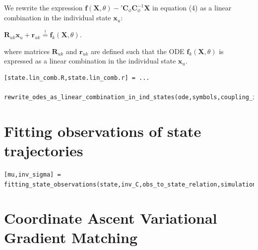 \begin{par}
We rewrite the expression $\mathbf{f}(\mathbf{X},\theta) - {'\mathbf{C}}_{\phi} \mathbf{C}_{\phi}^{-1} \mathbf{X}$ in equation (4) as a linear combination in the individual state $\mathbf{x}_u$:
\end{par} \vspace{1em}
\begin{par}
$\mathbf{R}_{uk} \mathbf{x}_u + \mathbf{r}_{uk} \stackrel{!}{=} \mathbf{f}_k(\mathbf{X},\theta)$.
\end{par} \vspace{1em}
\begin{par}
where matrices $\mathbf{R}_{uk}$ and $\mathbf{r}_{uk}$ are defined such that the ODE $\mathbf{f}_k(\mathbf{X},\theta)$ is expressed as a linear combination in the individual state $\mathbf{x}_u$.
\end{par} \vspace{1em}
\color{RoyalPurple}\begin{verbatim}
[state.lin_comb.R,state.lin_comb.r] = ...
    rewrite_odes_as_linear_combination_in_ind_states(ode,symbols,coupling_idx.states);
\end{verbatim}
\color{black}


\section{Fitting observations of state trajectories}
\color{RoyalPurple}\begin{verbatim}
[mu,inv_sigma] = fitting_state_observations(state,inv_C,obs_to_state_relation,simulation);
\end{verbatim}
\color{black}


\section{Coordinate Ascent Variational Gradient Matching}

